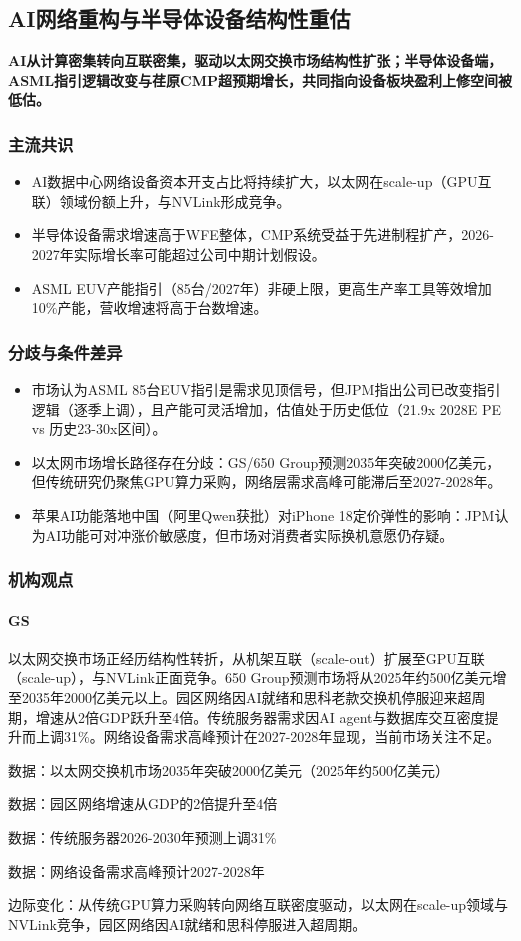 \documentclass[11pt]{ctexart}
\begin{document}
\subsection{AI网络重构与半导体设备结构性重估}
\textbf{AI从计算密集转向互联密集，驱动以太网交换市场结构性扩张；半导体设备端，ASML指引逻辑改变与荏原CMP超预期增长，共同指向设备板块盈利上修空间被低估。}
\subsubsection*{主流共识}
\begin{itemize}
  \item AI数据中心网络设备资本开支占比将持续扩大，以太网在scale-up（GPU互联）领域份额上升，与NVLink形成竞争。
  \item 半导体设备需求增速高于WFE整体，CMP系统受益于先进制程扩产，2026-2027年实际增长率可能超过公司中期计划假设。
  \item ASML EUV产能指引（85台/2027年）非硬上限，更高生产率工具等效增加10\%产能，营收增速将高于台数增速。
\end{itemize}
\subsubsection*{分歧与条件差异}
\begin{itemize}
  \item 市场认为ASML 85台EUV指引是需求见顶信号，但JPM指出公司已改变指引逻辑（逐季上调），且产能可灵活增加，估值处于历史低位（21.9x 2028E PE vs 历史23-30x区间）。
  \item 以太网市场增长路径存在分歧：GS/650 Group预测2035年突破2000亿美元，但传统研究仍聚焦GPU算力采购，网络层需求高峰可能滞后至2027-2028年。
  \item 苹果AI功能落地中国（阿里Qwen获批）对iPhone 18定价弹性的影响：JPM认为AI功能可对冲涨价敏感度，但市场对消费者实际换机意愿仍存疑。
\end{itemize}
\subsubsection*{机构观点}
\paragraph{GS} 以太网交换市场正经历结构性转折，从机架互联（scale-out）扩展至GPU互联（scale-up），与NVLink正面竞争。650 Group预测市场将从2025年约500亿美元增至2035年2000亿美元以上。园区网络因AI就绪和思科老款交换机停服迎来超周期，增速从2倍GDP跃升至4倍。传统服务器需求因AI agent与数据库交互密度提升而上调31\%。网络设备需求高峰预计在2027-2028年显现，当前市场关注不足。
{\small\color{refgray}数据：以太网交换机市场2035年突破2000亿美元（2025年约500亿美元）\par}
{\small\color{refgray}数据：园区网络增速从GDP的2倍提升至4倍\par}
{\small\color{refgray}数据：传统服务器2026-2030年预测上调31\%\par}
{\small\color{refgray}数据：网络设备需求高峰预计2027-2028年\par}
{\small\color{refgray}边际变化：从传统GPU算力采购转向网络互联密度驱动，以太网在scale-up领域与NVLink竞争，园区网络因AI就绪和思科停服进入超周期。\par}
\end{document}

